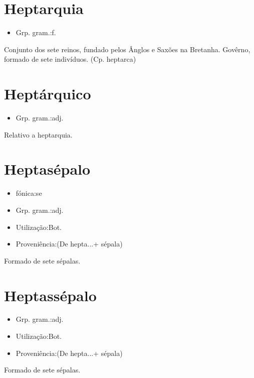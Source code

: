 \documentclass{article}
\begin{document}
\section{Heptarquia}
\begin{itemize}
\item {Grp. gram.:f.}
\end{itemize}
Conjunto dos sete reinos, fundado pelos Ânglos e Saxões na Bretanha.
Govêrno, formado de sete indivíduos.
(Cp. \textunderscore heptarca\textunderscore )
\section{Heptárquico}
\begin{itemize}
\item {Grp. gram.:adj.}
\end{itemize}
Relativo a heptarquia.
\section{Heptasépalo}
\begin{itemize}
\item {fónica:se}
\end{itemize}
\begin{itemize}
\item {Grp. gram.:adj.}
\end{itemize}
\begin{itemize}
\item {Utilização:Bot.}
\end{itemize}
\begin{itemize}
\item {Proveniência:(De \textunderscore hepta...\textunderscore  + \textunderscore sépala\textunderscore )}
\end{itemize}
Formado de sete sépalas.
\section{Heptassépalo}
\begin{itemize}
\item {Grp. gram.:adj.}
\end{itemize}
\begin{itemize}
\item {Utilização:Bot.}
\end{itemize}
\begin{itemize}
\item {Proveniência:(De \textunderscore hepta...\textunderscore  + \textunderscore sépala\textunderscore )}
\end{itemize}
Formado de sete sépalas.
\end{document}
